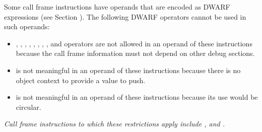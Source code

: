 Some call frame instructions have operands that are encoded
as DWARF expressions 
(see Section ). 
The following DWARF
operators cannot be used in such operands:


\begin{itemize}
\item
\DWOPaddrx, \DWOPcalltwo, \DWOPcallfour{}, \DWOPcallref, 
\DWOPconsttype, \DWOPconstx, \DWOPconvert, \DWOPdereftype, 
\DWOPregvaltype{} and \DWOPreinterpret{}
operators are 
not allowed in an operand of these instructions because
the call frame information must not depend on other
debug sections.

\item \DWOPpushobjectaddress{} is not meaningful in an operand
of these instructions because there is no object context to
provide a value to push.

\item \DWOPcallframecfa{} is not meaningful in an operand of
these instructions because its use would be circular.
\end{itemize}

\textit{Call frame instructions to which these restrictions apply
include \DWCFAdefcfaexpression, \DWCFAexpression{}
and \DWCFAvalexpression.}

